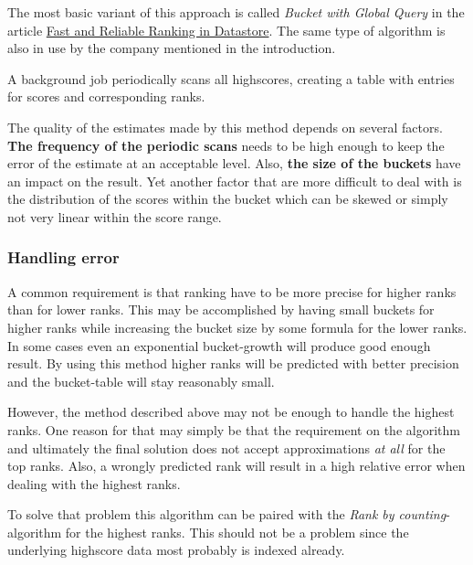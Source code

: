 The most basic variant of this approach is called \emph{Bucket with Global Query} in the article \href{https://cloud.google.com/datastore/docs/articles/fast-and-reliable-ranking-in-datastore/}{Fast and Reliable Ranking in Datastore}. The same type of algorithm is also in use by the company mentioned in the introduction.


A background job periodically scans all highscores, creating a table with entries for scores and corresponding ranks.

The quality of the estimates made by this method depends on several factors.
\textbf{The frequency of the periodic scans} needs to be high enough to keep the error of the estimate at an acceptable level. Also, \textbf{the size of the buckets} have an impact on the result. Yet another factor that are more difficult to deal with is the distribution of the scores within the bucket which can be skewed or simply not very linear within the score range.


\subsubsection*{Handling error}

A common requirement is that ranking have to be more precise for higher ranks than for lower ranks. This may be accomplished by having small buckets for higher ranks while increasing the bucket size by some formula for the lower ranks. In some cases even an exponential bucket-growth will produce good
enough result. By using this method higher ranks will be predicted with better precision and the bucket-table will stay reasonably small.

However, the method described above may not be enough to handle the highest ranks. One reason for that may simply be that the requirement on the algorithm and ultimately the final solution does not accept approximations \emph{at all} for the top ranks. Also, a wrongly predicted rank will result in a high relative error when dealing with the highest ranks.


To solve that problem this algorithm can be paired with the \emph{Rank by counting}-algorithm for the highest ranks. This should not be a problem since the underlying highscore data most probably is indexed already. 

